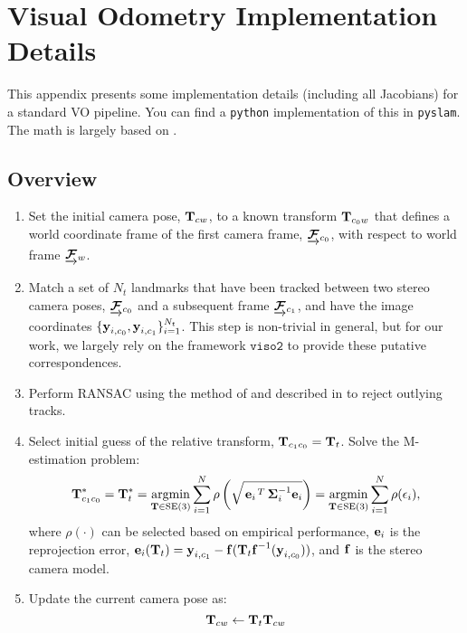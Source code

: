 \chapter{Visual Odometry Implementation Details}
\label{chap:appendix_vo}

This appendix presents some implementation details (including all Jacobians) for a standard VO pipeline. You can find a \texttt{python} implementation of this in \texttt{pyslam}. The math is largely based on \cite{Barfoot2017-ri}.

\section{Overview}
\begin{enumerate}
\item Set the initial camera pose, $\boldsymbol{\mathbf{T}}_{cw}$, to a known transform $\boldsymbol{\mathbf{T}}_{c_0w}$ that defines a world coordinate frame of the first camera frame, $\underrightarrow{ \boldsymbol{\mathbf{\mathcal{F}}} }_{c_0}$, with respect to world frame $\underrightarrow{ \boldsymbol{\mathbf{\mathcal{F}}} }_{w}$.
\item Match a set of $N_t$ landmarks that have been tracked between two stereo camera poses, $\underrightarrow{ \boldsymbol{\mathbf{\mathcal{F}}} }_{c_0}$ and a subsequent frame $\underrightarrow{ \boldsymbol{\mathbf{\mathcal{F}}} }_{c_1}$, and have the image coordinates $\{\boldsymbol{\mathbf{y}}_{i, c_0}, \boldsymbol{\mathbf{y}}_{i, c_1}\}_{i=1}^{N_t}$. This step is non-trivial in general, but for our work, we largely rely on the framework $\texttt{viso2}$ to provide these putative correspondences.
\item Perform RANSAC using the method of \cite{Umeyama1991-ws} and described in \cite{Barfoot2017-ri} to reject outlying tracks.
\item Select initial guess of the relative transform, $\boldsymbol{\mathbf{T}}_{c_1c_0} =  \boldsymbol{\mathbf{T}}_t$. Solve the M-estimation problem:  
\begin{equation}
\label{eq:vo_app_robust_loss}
  \boldsymbol{\mathbf{T}}_{c_1c_0}^* = \boldsymbol{\mathbf{T}}_t^* = \operatorname*{argmin}_{\boldsymbol{\mathbf{T}}\in\text{SE}(3)}\sum_{i=1}^{N} 
  \rho\left(\sqrt{\left.{\boldsymbol{\mathbf{e}}_{i}}\right.^T \boldsymbol{\mathbf{\Sigma}}_{i}^{-1} \boldsymbol{\mathbf{e}}_{i}}\right) = \operatorname*{argmin}_{\boldsymbol{\mathbf{T}}\in\text{SE}(3)}\sum_{i=1}^{N} 
  \rho(\epsilon_i),
\end{equation}
where $\rho(\cdot)$ can be selected based on empirical performance, $\boldsymbol{\mathbf{e}}_i$ is the reprojection error, $\boldsymbol{\mathbf{e}}_{i}(\boldsymbol{\mathbf{T}}_t)  = \boldsymbol{\mathbf{y}}_{i, c_1} - \boldsymbol{\mathbf{f}}( \boldsymbol{\mathbf{T}}_t 
    \boldsymbol{\mathbf{f}}^{-1}( \boldsymbol{\mathbf{y}}_{i, c_0} ) )$, and $\boldsymbol{\mathbf{f}}$ is the stereo camera model.
\item Update the current camera pose as:
\begin{equation}
	\boldsymbol{\mathbf{T}}_{cw} \leftarrow  \boldsymbol{\mathbf{T}}_t \boldsymbol{\mathbf{T}}_{cw}
\end{equation}
\end{enumerate}


